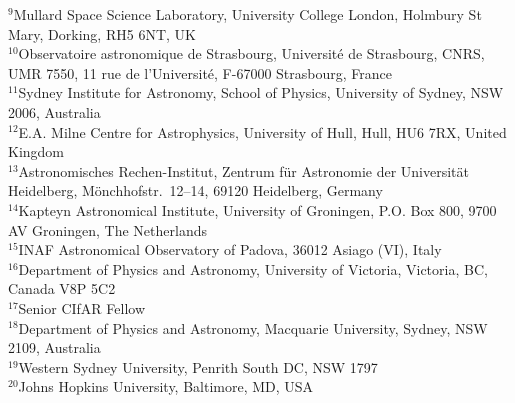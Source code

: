 \documentclass[preprint]{aastex}
\begin{document}
$^{9}${Mullard Space Science Laboratory, University College London, Holmbury St Mary, Dorking, RH5 6NT, UK} \\
$^{10}${Observatoire astronomique de Strasbourg, Universit\'e de Strasbourg, CNRS, UMR 7550, 11 rue de l'Universit\'e, F-67000 Strasbourg, France} \\
$^{11}${Sydney Institute for Astronomy, School of Physics, University of Sydney, NSW 2006, Australia} \\
$^{12}${E.A. Milne Centre for Astrophysics, University of Hull, Hull, HU6 7RX, United Kingdom} \\
$^{13}${Astronomisches Rechen-Institut, Zentrum f\"ur Astronomie der Universit\"at Heidelberg, M\"onchhofstr.\ 12--14, 69120 Heidelberg, Germany} \\
$^{14}${Kapteyn Astronomical Institute, University of Groningen, P.O. Box 800, 9700 AV Groningen, The Netherlands} \\
$^{15}${INAF Astronomical Observatory of Padova, 36012 Asiago (VI), Italy} \\
$^{16}${Department of Physics and Astronomy, University of Victoria, Victoria, BC, Canada V8P 5C2} \\
$^{17}${Senior CIfAR Fellow} \\
$^{18}${Department of Physics and Astronomy, Macquarie University, Sydney, NSW 2109, Australia} \\
$^{19}${Western Sydney University, Penrith South DC, NSW 1797} \\
$^{20}${Johns Hopkins University, Baltimore, MD, USA} \\
\end{document}
